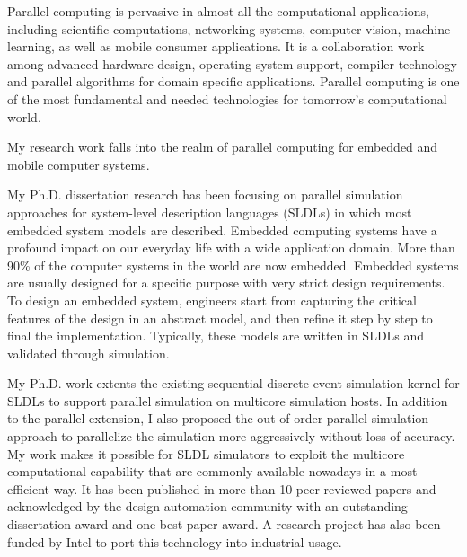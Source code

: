 Parallel computing is pervasive in almost all the computational applications, including scientific computations, networking systems, computer vision, machine learning, as well as mobile consumer applications. It is a collaboration work among advanced hardware design, operating system support, compiler technology and parallel algorithms for domain specific applications. Parallel computing is one of the most fundamental and needed technologies for tomorrow's computational world.  

My research work falls into the realm of parallel computing for embedded and mobile computer systems. 

\bigskip
My Ph.D. dissertation research has been focusing on parallel simulation approaches for system-level description languages (SLDLs) in which most embedded system models are described. 
Embedded computing systems have a profound impact on our everyday life with a wide application domain. More than 90\% of the computer systems in the world are now embedded. Embedded systems are usually designed for a specific purpose with very strict design requirements. To design an embedded system, engineers start from capturing the critical features of the design in an abstract model, and then refine it step by step to final the implementation. Typically, these models are written in SLDLs and validated through simulation. 

\bigskip
My Ph.D. work extents the existing sequential discrete event simulation kernel for SLDLs to support parallel simulation on multicore simulation hosts. In addition to the parallel extension, I also proposed the out-of-order parallel simulation approach to parallelize the simulation more aggressively without loss of accuracy. My work makes it possible for SLDL simulators to exploit the multicore computational capability that are commonly available nowadays in a most efficient way. It has been published in more than 10 peer-reviewed papers and acknowledged by the design automation community with an outstanding dissertation award and one best paper award. A research project has also been funded by Intel to port this technology into industrial usage. 

